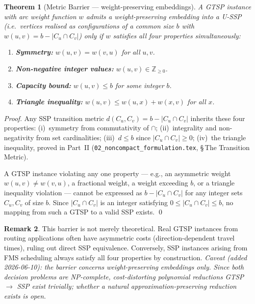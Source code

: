 \documentclass[11pt,a4paper]{article}
\theoremstyle{plain}
\newtheorem{theorem}{Theorem}[section]
\theoremstyle{definition}
\newtheorem{remark}[theorem]{Remark}
\begin{document}
\begin{thmbox}
\begin{theorem}[Metric Barrier --- weight-preserving embeddings]
\label{thm:barrier}
A GTSP instance with arc weight function $w$ admits a \emph{weight-preserving}
embedding into a U-SSP (i.e.\ vertices realised as configurations of a common
size $b$ with $w(u,v)=b-|C_u\cap C_v|$) only if $w$ satisfies all four
properties simultaneously:
\begin{enumerate}[label=(\roman*)]
\item \textbf{Symmetry:} $w(u,v) = w(v,u)$ for all $u,v$.
\item \textbf{Non-negative integer values:} $w(u,v) \in \mathbb{Z}_{\ge 0}$.
\item \textbf{Capacity bound:} $w(u,v) \le b$ for some integer $b$.
\item \textbf{Triangle inequality:} $w(u,v) \le w(u,x) + w(x,v)$ for all $x$.
\end{enumerate}
\end{theorem}
\end{thmbox}

\begin{proofbox}
\begin{proof}
Any SSP transition metric $d(C_u,C_v) = b - |C_u \cap C_v|$ inherits
these four properties:
(i)~symmetry from commutativity of $\cap$;
(ii)~integrality and non-negativity from set cardinalities;
(iii)~$d \le b$ since $|C_u \cap C_v| \ge 0$;
(iv)~the triangle inequality, proved in Part~II
(\texttt{02\_noncompact\_formulation.tex}, \S\,The Transition Metric).

A GTSP instance violating any one property — e.g., an asymmetric weight
$w(u,v) \ne w(v,u)$, a fractional weight, a weight exceeding $b$, or a
triangle inequality violation — cannot be expressed as $b - |C_u \cap C_v|$
for any integer sets $C_u, C_v$ of size $b$. Since $|C_u \cap C_v|$ is an
integer satisfying $0 \le |C_u \cap C_v| \le b$, no mapping from such a GTSP
to a valid SSP exists. \qed
\end{proof}
\end{proofbox}

\begin{remark}
This barrier is not merely theoretical. Real GTSP instances from routing
applications often have asymmetric costs (direction-dependent travel times),
ruling out direct SSP equivalence. Conversely, SSP instances arising from FMS
scheduling always satisfy all four properties by construction.
\emph{Caveat (added 2026-06-10): the barrier concerns weight-preserving
embeddings only. Since both decision problems are NP-complete,
\emph{cost-distorting} polynomial reductions GTSP $\to$ SSP exist trivially;
whether a natural approximation-preserving reduction exists is open.}
\end{remark}
\end{document}
